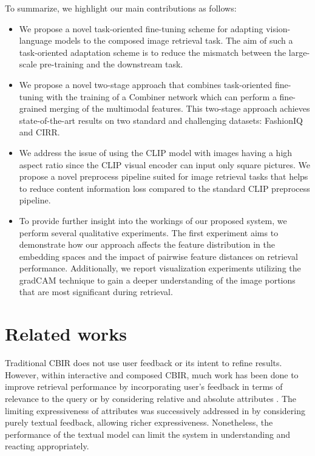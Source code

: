 \documentclass[acmlarge]{acmart}
\begin{document}
To summarize, we highlight our main contributions as follows:
\begin{itemize}
    \item We propose a novel task-oriented fine-tuning scheme for adapting vision-language models to the composed image retrieval task. The aim of such a task-oriented adaptation scheme is to reduce the mismatch between the large-scale pre-training and the downstream task.

    \item We propose a novel two-stage approach that combines task-oriented fine-tuning with the training of a Combiner network which can perform a fine-grained merging of the multimodal features. This two-stage approach achieves state-of-the-art results on two standard and challenging datasets: FashionIQ and CIRR.

    \item We address the issue of using the CLIP model with images having a high aspect ratio since the CLIP visual encoder can input only square pictures. We propose a novel preprocess pipeline suited for image retrieval tasks that helps to reduce content information loss compared to the standard CLIP preprocess pipeline.
    
    \item To provide further insight into the workings of our proposed system, we perform several qualitative experiments. The first experiment aims to demonstrate how our approach affects the feature distribution in the embedding spaces and the impact of pairwise feature distances on retrieval performance. Additionally, we report visualization experiments utilizing the gradCAM technique \cite{Selvaraju2019gradCAM} to gain a deeper understanding of the image portions that are most significant during retrieval.
\end{itemize}





\section{Related works}\label{sec:previous}
Traditional CBIR does not use user feedback or its intent to refine results. However, within interactive and composed CBIR, much work has been done to improve retrieval performance by incorporating user's feedback in terms of relevance to the query \cite{718510} or by considering relative \cite{Kovashka_2015} and absolute attributes \cite{8100135, han2017automatic}. The limiting expressiveness of attributes was successively addressed in \cite{vo2019composing, guo2018dialog} by considering purely textual feedback, allowing richer expressiveness. Nonetheless, the performance of the textual model can limit the system in understanding and reacting appropriately. 
\end{document}
